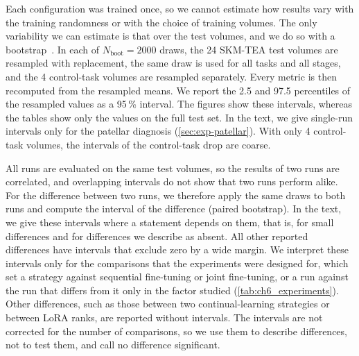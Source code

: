 Each configuration was trained once, so we cannot estimate how results vary with the training randomness or with the choice of training volumes.
The only variability we can estimate is that over the test volumes, and we do so with a bootstrap~\cite{efron1993bootstrap}.
In each of $N_{\mathrm{boot}} = 2000$ draws, the 24 SKM-TEA test volumes are resampled with replacement, the same draw is used for all tasks and all stages, and the 4 control-task volumes are resampled separately.
Every metric is then recomputed from the resampled means.
We report the 2.5 and 97.5 percentiles of the resampled values as a 95\,\% interval.
The figures show these intervals, whereas the tables show only the values on the full test set.
In the text, we give single-run intervals only for the patellar diagnosis (\cref{sec:exp-patellar}).
With only 4 control-task volumes, the intervals of the control-task drop are coarse.

All runs are evaluated on the same test volumes, so the results of two runs are correlated, and overlapping intervals do not show that two runs perform alike.
For the difference between two runs, we therefore apply the same draws to both runs and compute the interval of the difference (paired bootstrap).
In the text, we give these intervals where a statement depends on them, that is, for small differences and for differences we describe as absent.
All other reported differences have intervals that exclude zero by a wide margin.
We interpret these intervals only for the comparisons that the experiments were designed for, which set a strategy against sequential fine-tuning or joint fine-tuning, or a run against the run that differs from it only in the factor studied (\cref{tab:ch6_experiments}).
Other differences, such as those between two continual-learning strategies or between LoRA ranks, are reported without intervals.
The intervals are not corrected for the number of comparisons, so we use them to describe differences, not to test them, and call no difference significant.

